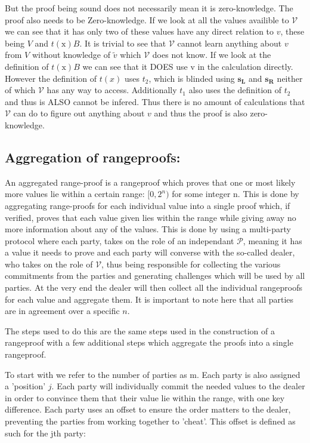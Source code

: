 \documentclass{article}
\newcommand{\ran}[1]{\mathrm{#1}}
\newcommand{\vecran}[1]{\mathbf{#1}}
\newcommand{\V}{\mathcal{V}}
\renewcommand{\P}{\mathcal{P}}
\newcommand{\tv}{\widetilde{v}}
\begin{document}
But the proof being sound does not necessarily mean it is zero-knowledge. The proof also needs to be Zero-knowledge. If we look at all the values availible to $\V$ we can see that it has only two of these values have any direct relation to $v$, these being $V$ and $t(\ran{x})B$. It is trivial to see that $\V$ cannot learn anything about $v$ from $V$ without knowledge of $\tv$ which $\V$ does not know. If we look at the definition of $t(\ran{x})B$ we can see that it DOES use v in the calculation directly. However the definition of $t(x)$ uses $t_2$, which is blinded using $\vecran{s_L}$ and $\vecran{s_R}$ neither of which $\V$ has any way to access. Additionally $t_1$ also uses the definition of $t_2$ and thus is ALSO cannot be infered. Thus there is no amount of calculations that $\V$ can do to figure out anything about $v$ and thus the proof is also zero-knowledge.

\subsection{Aggregation of rangeproofs:}

An aggregated range-proof is a rangeproof which proves that one or most likely more values lie within a certain range: $[0,2^n)$ for some integer n. This is done by aggregating range-proofs for each individual value into a single proof which, if verified, proves that each value given lies within the range while giving away no more information about any of the values. This is done by using a multi-party protocol where each party, takes on the role of an independant $\P$, meaning it has a value it needs to prove and each party will converse with the so-called dealer, who takes on the role of $\V$, thus being responsible for collecting the various commitments from the parties and generating challenges which will be used by all parties. At the very end the dealer will then collect all the individual rangeproofs for each value and aggregate them. It is important to note here that all parties are in agreement over a specific $n$.

The steps used to do this are the same steps used in the construction of a rangeproof with a few additional steps which aggregate the proofs into a single rangeproof. 

To start with we refer to the number of parties as m. Each party is also assigned a 'position' $j$. Each party will individually commit the needed values to the dealer in order to convince them that their value lie within the range, with one key difference. Each party uses an offset to ensure the order matters to the dealer, preventing the parties from working together to 'cheat'. This offset is defined as such for the jth party:
\end{document}
